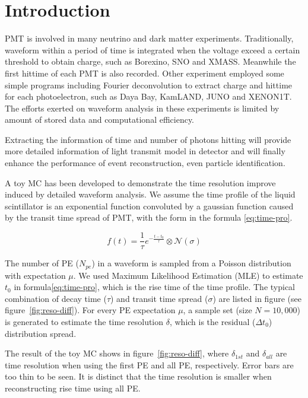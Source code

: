 \section{Introduction} %
\label{sec:Introduction}
PMT is involved in many neutrino and dark matter experiments. Traditionally, waveform within a period of time is integrated when the voltage exceed a certain threshold to obtain charge, such as Borexino\cite{lagomarsino_gateless_1999}, SNO\cite{dunger_event_2019} and XMASS\cite{abe_xmass_2013}. Meanwhile the first hittime of each PMT is also recorded. Other experiment employed some simple programs including Fourier deconvolution to extract charge and hittime for each photoelectron, such as Daya Bay\cite{huang_flash_2018}, KamLAND\cite{the_kamland_collaboration_production_2010}, JUNO\cite{zhang_comparison_2019} and XENON1T\cite{aprile_xenon1t_2019}. The efforts exerted on waveform analysis in these experiments is limited by amount of stored data and computational efficiency. 

Extracting the information of time and number of photons hitting will provide more detailed information of light transmit model in detector and will finally enhance the performance of event reconstruction, even particle identification. 

A toy MC has been developed to demonstrate the time resolution improve induced by detailed waveform analysis. We assume the time profile of the liquid scintillator is an exponential function convoluted by a gaussian function\cite{li_separation_2016} caused by the transit time spread of PMT, with the form in the formula \eqref{eq:time-pro}. 

\begin{equation}
    f(t) = \frac{1}{\tau}e^{-\frac{t - t_{0}}{\tau}} \otimes \mathcal{N}(\sigma)
    \label{eq:time-pro}
\end{equation}

The number of PE ($N_{pe}$) in a waveform is sampled from a Poisson distribution with expectation $\mu$. We used Maximum Likelihood Estimation (MLE) to estimate $t_{0}$ in formula\eqref{eq:time-pro}, which is the rise time of the time profile. The typical combination of decay time ($\tau$) and transit time spread ($\sigma$) are listed in figure (see figure~\ref{fig:reso-diff}). For every PE expectation $\mu$, a sample set (size $N=10,000$) is generated to estimate the time resolution $\delta$, which is the residual ($\Delta t_{0}$) distribution spread. 

The result of the toy MC shows in figure~\ref{fig:reso-diff}, where $\delta_{1st}$ and $\delta_{all}$ are time resolution when using the first PE and all PE, respectively.  Error bars are too thin to be seen. It is distinct that the time resolution is smaller when reconstructing rise time using all PE. 

